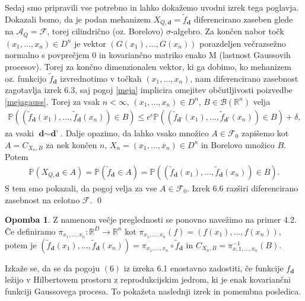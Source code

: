 \documentclass[12pt,a4paper]{amsart}
\theoremstyle{definition} %
\newtheorem{opomba}[definicija]{Opomba}
\theoremstyle{plain} %
\begin{document}
Sedaj smo pripravili vse potrebno in lahko dokažemo uvodni izrek tega poglavja.
Dokazali bomo, da je podan mehanizem $X_{Q,\textbf{d}} = \tilde{f}_{\textbf{d}}$ diferencirano zaseben glede na $\mathcal{A}_Q = \mathcal{F}$, torej cilindrično (oz. Borelovo) $\sigma$-algebro. Za končen nabor točk $(x_1,...,x_n) \in D^n$ je vektor $(G(x_1),...,G(x_n))$ porazdeljen večrazsežno normalno s povprečjem 0 in kovariančno matriko enako M (lastnost Gaussovih procesov). Torej za končno dimenzionalen vektor, ki ga dobimo, ko mehanizem oz. funkcijo $\tilde{f}_{\textbf{d}}$ izvrednotimo v točkah $(x_1,...,x_n) $, nam diferencirano zasebnost zagotavlja izrek 6.3, saj pogoj \eqref{meja} implicira omejitev občutljivosti poizvedbe \eqref{mejagauss}. Torej za vsak $n < \infty$, $(x_1,...,x_n) \in D^n$, $B \in \mathcal{B}(\mathbb{R}^n)$ velja
\begin{gather*}
\mathbb{P}((\tilde{f}_{\textbf{d}}(x_1),...,\tilde{f}_{\textbf{d}}(x_n)) \in B) \leq e^{\epsilon}\mathbb{P}((\tilde{f}_{\textbf{d'}}(x_1),...,\tilde{f}_{\textbf{d'}}(x_n)) \in B) + \delta,
\end{gather*}
za vsaki $\textbf{d} \sim \textbf{d'}$. Dalje opazimo, da lahko vsako množico $A \in \mathcal{F}_0$ zapišemo kot $A = C_{X_n,B}$ za nek končen $n$, $X_n = (x_1,...,x_n) \in D^n$ in Borelovo množico $B$. Potem 
\begin{gather*}
\mathbb{P}(X_{Q,\textbf{d}} \in A) = \mathbb{P}(\tilde{f}_{\textbf{d}}\in A)= \mathbb{P}((\tilde{f}_{\textbf{d}}(x_1),...,\tilde{f}_{\textbf{d}}(x_n)) \in B).
\end{gather*}
S tem smo pokazali, da pogoj velja za vse $A \in \mathcal{F}_0$. Izrek 6.6 razširi diferencirano zasebnost na celotno $\mathcal{F}$.
\qed
\newline
\newline
\begin{opomba}
Z namenom večje preglednosti se ponovno navežimo na primer 4.2. Če definiramo $\pi_{x_1,...,x_n} : \mathbb{R}^D \rightarrow \mathbb{R}^n$ kot $\pi_{x_1,...,x_n}(f) = (f(x_1),...,f(x_n))$, potem je $(\tilde{f}_{\textbf{d}}(x_1),...,\tilde{f}_{\textbf{d}}(x_n)) = \pi_{x_1,...,x_n} \circ \tilde{f}_{\textbf{d}}$ in $C_{X_n,B} = \pi_{x,1,...,x_n}^{-1}(B)$.
\end{opomba}
Izkaže se, da se da pogoju $(6)$ iz izreka 6.1 enostavno zadostiti, če funkcije $f_{\textbf{d}}$ ležijo v Hilbertovem prostoru z reprodukcijskim jedrom, ki je enak kovariančni funkciji Gaussovega procesa. To pokažeta naslednji izrek in pomembna posledica.
\end{document}
